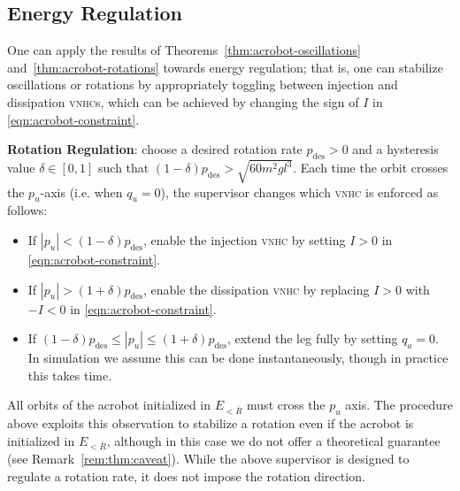 \documentclass[journal,twoside,web, twocolumn]{ieeecolor}
\newcommand*{\vnhc}{\textsc{vnhc}\xspace}
\newcommand*{\vnhcs}{\textsc{vnhc}s\xspace}
\begin{document}
\subsection{Energy Regulation}\label{sec:energy-reg}
One can apply the results of Theorems~\ref{thm:acrobot-oscillations} and~\ref{thm:acrobot-rotations}
towards energy regulation; 
that is, one can stabilize oscillations or rotations by appropriately toggling
between injection and dissipation \vnhcs, which can be achieved by changing the
sign of \(I\) in \eqref{eqn:acrobot-constraint}.



\textbf{Rotation Regulation}: choose a desired rotation rate 
\(p_\text{des} > 0\) and a hysteresis value \(\delta \in [0,1]\) such that \((1-\delta) p_\text{des} > \sqrt{60m^2gl^3}\). Each time the orbit crosses the \(p_u\)-axis (i.e. when \(q_u = 0\)), the
supervisor changes which \vnhc is enforced as follows:
\begin{itemize}
    \item If \(|p_u| < (1-\delta)p_\text{des}\), enable the injection \vnhc by
        setting \(I > 0\) in \eqref{eqn:acrobot-constraint}.
    \item If \(|p_u| > (1+\delta)p_\text{des}\), enable the dissipation \vnhc by
        replacing \(I > 0\) with \(-I < 0\) in \eqref{eqn:acrobot-constraint}.
    \item If \((1-\delta)p_\text{des} \leq |p_u| \leq (1+\delta)p_\text{des}\),
        extend the leg fully by setting \(q_a = 0\).
        In simulation we assume this can be done instantaneously,
        though in practice this takes time.
\end{itemize}

All orbits of the acrobot initialized in $E_{< \bar R}$ must cross the \(p_u\) axis. The procedure above exploits this observation to stabilize a rotation even if the acrobot is initialized in $E_{< \bar R}$, although in this case we do not offer a theoretical guarantee (see Remark~\ref{rem:thm:caveat}). While the above supervisor is designed to regulate a rotation rate, it
does not impose the rotation direction.

\end{document}
